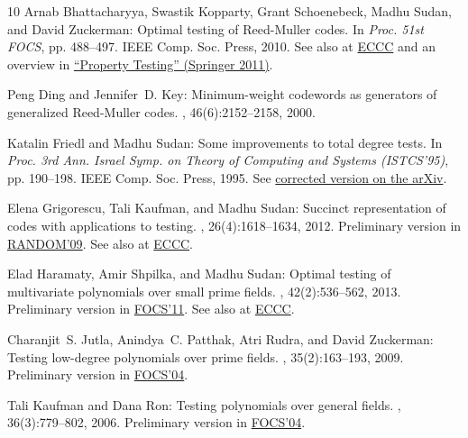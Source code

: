 \begin{thebibliography}{10}
{\sc Arnab Bhattacharyya, Swastik Kopparty, Grant Schoenebeck, Madhu Sudan, and
  David Zuckerman}: Optimal testing of {Reed-Muller} codes.
\newblock In {\em Proc. 51st FOCS}, pp. 488--497. IEEE Comp. Soc. Press, 2010.
\newblock See also at \href{http://eccc.hpi-web.de/report/2009/086/}{ECCC} and
  an overview in
  \href{http://dx.doi.org/10.1007/978-3-642-16367-8\_19}{``Property Testing''
  (Springer 2011)}.

{\sc Peng Ding and Jennifer~D. Key}: Minimum-weight codewords as generators of
  generalized {Reed-Muller} codes.
, 46(6):2152--2158, 2000.
\newblock [\epfmtdoi{10.1109/18.868484}]

{\sc Katalin Friedl and Madhu Sudan}: Some improvements to total degree tests.
\newblock In {\em Proc. 3rd Ann. Israel Symp. on Theory of Computing and
  Systems (ISTCS'95)}, pp. 190--198. IEEE Comp. Soc. Press, 1995.
\newblock See \href{http://arxiv.org/abs/1307.3975}{corrected version on the
  arXiv}.

{\sc Elena Grigorescu, Tali Kaufman, and Madhu Sudan}: Succinct representation
  of codes with applications to testing.
, 26(4):1618--1634, 2012.
\newblock Preliminary version in
  \href{http://dx.doi.org/10.1007/978-3-642-03685-9_40}{RANDOM'09}. See also at
  \href{http://eccc.hpi-web.de/report/2009/043/}{ECCC}.
\newblock [\epfmtdoi{10.1137/100818364}]

{\sc Elad Haramaty, Amir Shpilka, and Madhu Sudan}: Optimal testing of
  multivariate polynomials over small prime fields.
, 42(2):536--562, 2013.
\newblock Preliminary version in
  \href{http://dx.doi.org/10.1109/FOCS.2011.61}{FOCS'11}. See also at
  \href{http://eccc.hpi-web.de/report/2011/059/}{ECCC}.
\newblock [\epfmtdoi{10.1137/120879257}]

{\sc Charanjit~S. Jutla, Anindya~C. Patthak, Atri Rudra, and David Zuckerman}:
  Testing low-degree polynomials over prime fields.
, 35(2):163--193, 2009.
\newblock Preliminary version in
  \href{http://dx.doi.org/10.1109/FOCS.2004.64}{FOCS'04}.

{\sc Tali Kaufman and Dana Ron}: Testing polynomials over general fields.
, 36(3):779--802, 2006.
\newblock Preliminary version in
  \href{http://dx.doi.org/10.1109/FOCS.2004.65}{FOCS'04}.
\newblock [\epfmtdoi{10.1137/S0097539704445615}]


\end{thebibliography}
